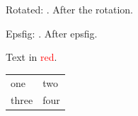 \documentclass{article}
\begin{document}
Rotated: . After the rotation.

Epsfig: . After epsfig.

Text in \textcolor{red}{red}.

\begin{tabular}{ll}
\rowcolor{yellow} one & two \\
three & four \\
\end{tabular}
\end{document}
